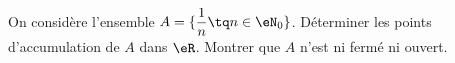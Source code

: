 \begin{exercice}\label{exoGeomAnal-0010}

On considère l'ensemble $A= \{ \displaystyle \frac{1}{n} \tq n \in \eN_0 \}$.  Déterminer les points d'accumulation de $A$ dans $\eR$.  Montrer que $A$ n'est ni fermé ni ouvert.

\end{exercice}
